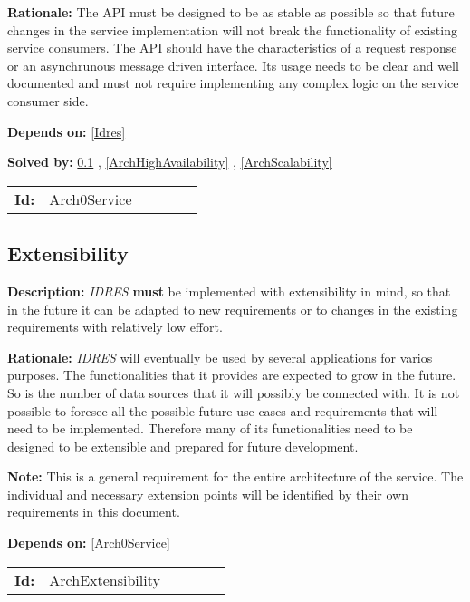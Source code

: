 \textbf{Rationale:} The API must be designed to be as stable as possible  so that future changes in the service implementation will not  break the functionality of existing service consumers.  The API should have the characteristics of  a request response or an asynchrunous message driven interface.  Its usage needs to be clear and well documented and must not require  implementing any complex logic on the service consumer side.

\textbf{Depends on:} \ref{Idres} 

\textbf{Solved by:} \ref{ArchExtensibility} , \ref{ArchHighAvailability} , \ref{ArchScalability} 

\par
{\small \begin{center}\begin{tabular}{rlrlrl}
\textbf{Id:} & Arch0Service  & & & \end{tabular}\end{center} }

\subsection{Extensibility}\label{ArchExtensibility}
\textbf{Description:} \textsl{IDRES} \textbf{must} be implemented with extensibility in mind, so that in the future it can be adapted to new requirements or to changes in the existing requirements with relatively low effort.

\textbf{Rationale:} \textsl{IDRES} will eventually be used by several applications  for varios purposes. The functionalities that it provides are  expected to grow in the future. So is the number of data sources that it will possibly be connected with. It is not possible to foresee all the  possible future use cases and requirements that will need to be implemented. Therefore many of its functionalities need to be designed to be extensible and prepared for future development. 

\textbf{Note:} This is a general requirement for the entire architecture of the  service. The individual and necessary extension points will be identified  by their own requirements in this document.

\textbf{Depends on:} \ref{Arch0Service} 

\par
{\small \begin{center}\begin{tabular}{rlrlrl}
\textbf{Id:} & ArchExtensibility  & & & \end{tabular}\end{center} }

